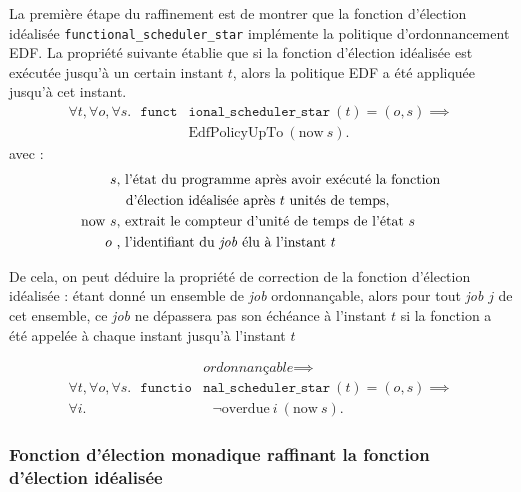 	La première étape du raffinement est de montrer que la fonction d'élection idéalisée \texttt{functional\_scheduler\_star} implémente la politique d'ordonnancement EDF. La propriété suivante établie que si la fonction d'élection idéalisée est exécutée jusqu'à un certain instant $t$, alors la politique EDF a été appliquée jusqu'à cet instant.
	\begin{equation}
	\begin{split}
		\forall t, \forall o, \forall s.~~~\texttt{funct}&\texttt{ional\_scheduler\_star}~(t) = (o,s) \implies\\
		&\text{EdfPolicyUpTo}~(\text{now}~s).
	\end{split}
	\end{equation}
\indent	avec :
	\begin{align*}
		s&\text{, l'état du programme après avoir exécuté la fonction}\\
		&~~\text{d'élection idéalisée après $t$ unités de temps},\\
		\text{now}~s&\text{, extrait le compteur d'unité de temps de l'état $s$}\\
		o~&\text{, l'identifiant du \emph{job} élu à l'instant $t$}
	\end{align*}

	De cela, on peut déduire la propriété de correction de la fonction d'élection idéalisée :
	étant donné un ensemble de \emph{job} ordonnançable, alors pour tout \emph{job} $j$ de cet ensemble, ce \emph{job} ne dépassera pas son échéance à l'instant $t$ si la fonction a été appelée à chaque instant jusqu'à l'instant $t$

	\begin{equation}
	\begin{split}
		&\textit{ordonnançable} \implies\\
		\forall t, \forall o, \forall s.~~~\texttt{functio}&\texttt{nal\_scheduler\_star}~(t) = (o,s) \implies\\
		\forall i.&~~~\neg \text{overdue}~i~(\text{now}~s).
	\end{split}
	\end{equation}

	\subsubsection{Fonction d'élection monadique raffinant la fonction d'élection idéalisée}
	\label{sec:monadic}

